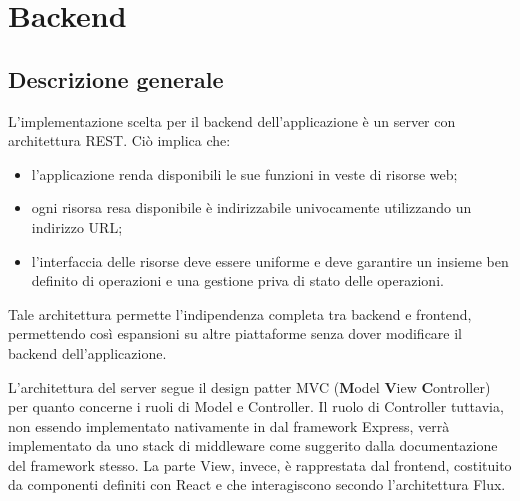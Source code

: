 \section{Backend}


\subsection{Descrizione generale}
L'implementazione scelta per il backend dell'applicazione è un server con architettura REST. Ciò implica che:
\begin{itemize}
\item l'applicazione renda disponibili le sue funzioni in veste di risorse web;
\item ogni risorsa resa disponibile è indirizzabile univocamente utilizzando un indirizzo URL;
\item l'interfaccia delle risorse deve essere uniforme e deve garantire un insieme ben definito di operazioni e una gestione priva di stato delle operazioni.
\end{itemize}

Tale architettura permette l'indipendenza completa tra backend e frontend, permettendo così espansioni su altre piattaforme senza dover modificare il backend dell'applicazione.

L'architettura del server segue il design patter MVC (\textbf{M}odel \textbf{V}iew \textbf{C}ontroller) per quanto concerne i ruoli di Model e Controller. 
Il ruolo di Controller tuttavia, non essendo implementato nativamente in dal framework Express, verrà implementato da uno stack di middleware come suggerito dalla documentazione del framework stesso.
La parte View, invece, è rapprestata dal frontend, costituito da componenti definiti con React e che interagiscono secondo l'architettura Flux.

